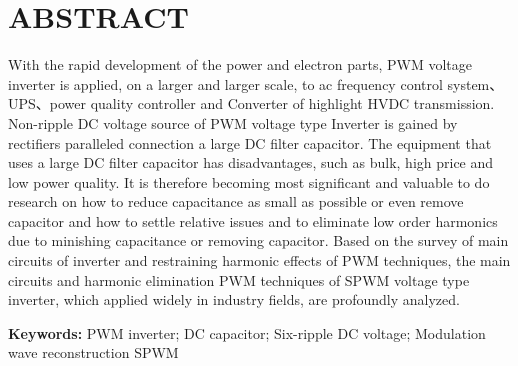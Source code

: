 \thispagestyle{fancy}
\fancyhf{}
\fancyfoot[C]{\thepage}
\section*{ABSTRACT}
\vspace{0.3cm}
\begin{spacing}{1.5}
\large{
With the rapid development of the power and electron parts, PWM voltage inverter is applied, on a larger and larger scale, to ac frequency control system、UPS、power quality controller and Converter of highlight HVDC transmission. Non-ripple DC voltage source of PWM voltage type Inverter is gained by rectifiers paralleled connection a large DC filter capacitor. The equipment that uses a large DC filter capacitor has disadvantages, such as bulk, high price and low power quality. It is therefore becoming most significant and valuable to do research on how to reduce capacitance as small as possible or even remove capacitor and how to settle relative issues and to eliminate low order harmonics due to minishing capacitance or removing capacitor. Based on the survey of main circuits of inverter and restraining harmonic effects of PWM techniques, the main circuits and harmonic elimination PWM techniques of SPWM voltage type inverter, which applied widely in industry fields, are profoundly analyzed.\par
\vspace{1em}

\noindent\textbf{Keywords:} {PWM inverter; DC capacitor; Six-ripple DC voltage; Modulation wave reconstruction SPWM}

}
\end{spacing}
